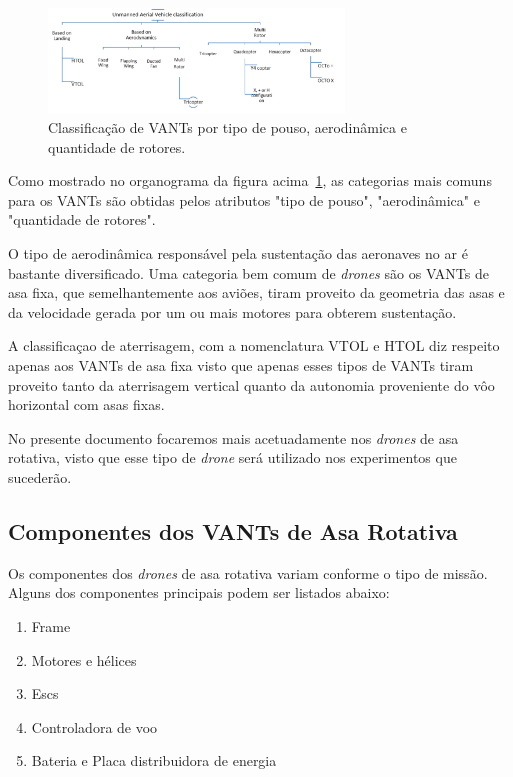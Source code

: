 \documentclass[12pt,a4paper,oneside]{book}
\begin{document}
\begin{figure}[!htbp]
  \centering
  \includegraphics[width=0.7\textwidth]{Images/introducao/drone_classification.png}
  \caption{Classificação de VANTs por tipo de pouso, aerodinâmica e quantidade de rotores.}
  \label{fig:drone_classification.png}
\end{figure}

Como mostrado no organograma da figura acima~\ref{fig:drone_classification.png}, as categorias mais comuns para os VANTs são obtidas pelos atributos "tipo de pouso", "aerodinâmica" e "quantidade de rotores".

O tipo de aerodinâmica responsável pela sustentação das aeronaves no ar é bastante diversificado. Uma categoria bem comum de \textit{drones} são os VANTs de asa fixa, que semelhantemente aos aviões, tiram proveito da geometria das asas e da velocidade gerada por um ou mais motores para obterem sustentação. 

A classificaçao de aterrisagem, com a nomenclatura VTOL e HTOL diz respeito apenas aos VANTs de asa fixa visto que apenas esses tipos de VANTs tiram proveito tanto da aterrisagem vertical quanto da autonomia proveniente do vôo horizontal com asas fixas. 

No presente documento focaremos mais acetuadamente nos \textit{drones} de asa rotativa, visto que esse tipo de \textit{drone} será utilizado nos experimentos que sucederão.

\subsection{Componentes dos VANTs de Asa Rotativa}

Os componentes dos \textit{drones} de asa rotativa variam conforme o tipo de missão. Alguns dos componentes principais podem ser listados abaixo:

\begin{enumerate}
  \item Frame
  \item Motores e hélices
  \item Escs
  \item Controladora de voo
  \item Bateria e Placa distribuidora de energia
\end{enumerate}
\end{document}
